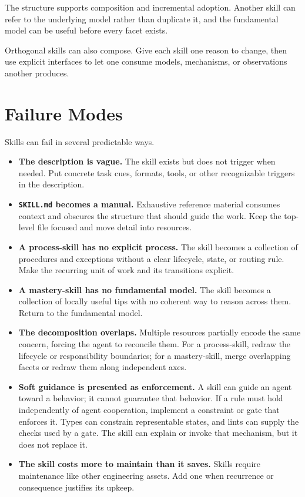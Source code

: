
The structure supports composition and incremental adoption. Another skill can refer to the underlying model rather than duplicate it, and the fundamental model can be useful before every facet exists.

Orthogonal skills can also compose. Give each skill one reason to change, then use explicit interfaces to let one consume models, mechanisms, or observations another produces.

\section{Failure Modes}\label{heading:failure-modes}

Skills can fail in several predictable ways.

\begin{itemize}
\tightlist
\item
  \textbf{The description is vague.} The skill exists but does not trigger when needed. Put concrete task cues, formats, tools, or other recognizable triggers in the description.
\item
  \textbf{\texttt{SKILL.md} becomes a manual.} Exhaustive reference material consumes context and obscures the structure that should guide the work. Keep the top-level file focused and move detail into resources.
\item
  \textbf{A process-skill has no explicit process.} The skill becomes a collection of procedures and exceptions without a clear lifecycle, state, or routing rule. Make the recurring unit of work and its transitions explicit.
\item
  \textbf{A mastery-skill has no fundamental model.} The skill becomes a collection of locally useful tips with no coherent way to reason across them. Return to the fundamental model.
\item
  \textbf{The decomposition overlaps.} Multiple resources partially encode the same concern, forcing the agent to reconcile them. For a process-skill, redraw the lifecycle or responsibility boundaries; for a mastery-skill, merge overlapping facets or redraw them along independent axes.
\item
  \textbf{Soft guidance is presented as enforcement.} A skill can guide an agent toward a behavior; it cannot guarantee that behavior. If a rule must hold independently of agent cooperation, implement a constraint or gate that enforces it. Types can constrain representable states, and lints can supply the checks used by a gate. The skill can explain or invoke that mechanism, but it does not replace it.
\item
  \textbf{The skill costs more to maintain than it saves.} Skills require maintenance like other engineering assets. Add one when recurrence or consequence justifies its upkeep.
\end{itemize}

